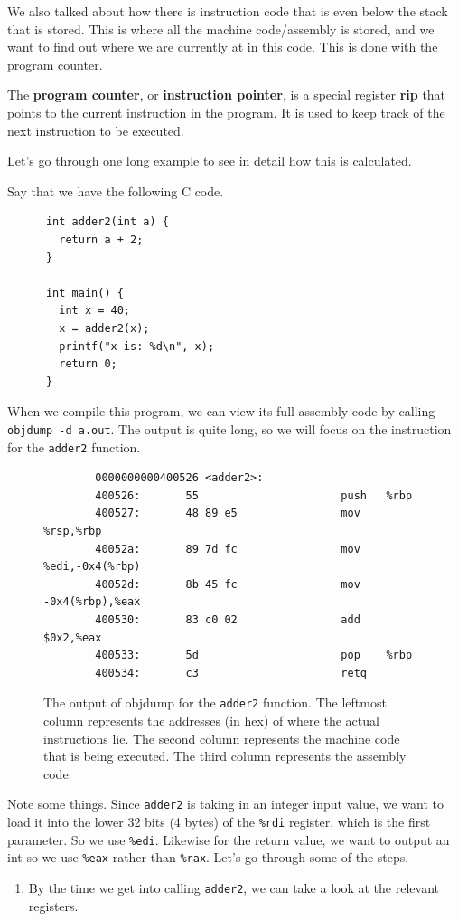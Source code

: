 \documentclass{article}
\begin{document}
  We also talked about how there is instruction code that is even below the stack that is stored. This is where all the machine code/assembly is stored, and we want to find out where we are currently at in this code. This is done with the program counter. 

  \begin{definition} 
    The \textbf{program counter}, or \textbf{instruction pointer}, is a special register \textbf{rip} that points to the current instruction in the program. It is used to keep track of the next instruction to be executed.
  \end{definition}

  Let's go through one long example to see in detail how this is calculated. 
  
  \begin{example}
    Say that we have the following C code. 
    \begin{lstlisting}
      int adder2(int a) {
        return a + 2; 
      }

      int main() {
        int x = 40; 
        x = adder2(x); 
        printf("x is: %d\n", x);
        return 0; 
      }
    \end{lstlisting}
    When we compile this program, we can view its full assembly code by calling \texttt{objdump -d a.out}. The output is quite long, so we will focus on the instruction for the \texttt{adder2} function. 
    \begin{figure}[H]
      \centering 
      \begin{lstlisting}
        0000000000400526 <adder2>:
        400526:       55                      push   %rbp
        400527:       48 89 e5                mov    %rsp,%rbp
        40052a:       89 7d fc                mov    %edi,-0x4(%rbp)
        40052d:       8b 45 fc                mov    -0x4(%rbp),%eax
        400530:       83 c0 02                add    $0x2,%eax
        400533:       5d                      pop    %rbp
        400534:       c3                      retq
      \end{lstlisting}
      \caption{The output of objdump for the \texttt{adder2} function. The leftmost column represents the addresses (in hex) of where the actual instructions lie. The second column represents the machine code that is being executed. The third column represents the assembly code.}
      \label{fig:adder2} 
    \end{figure}
    Note some things. Since \texttt{adder2} is taking in an integer input value, we want to load it into the lower 32 bits (4 bytes) of the \texttt{\%rdi} register, which is the first parameter. So we use \texttt{\%edi}. Likewise for the return value, we want to output an int so we use \texttt{\%eax} rather than \texttt{\%rax}. Let's go through some of the steps. 
    \begin{enumerate}
      \item By the time we get into calling \texttt{adder2}, we can take a look at the relevant registers. 


\end{enumerate}
\end{example}
\end{document}
